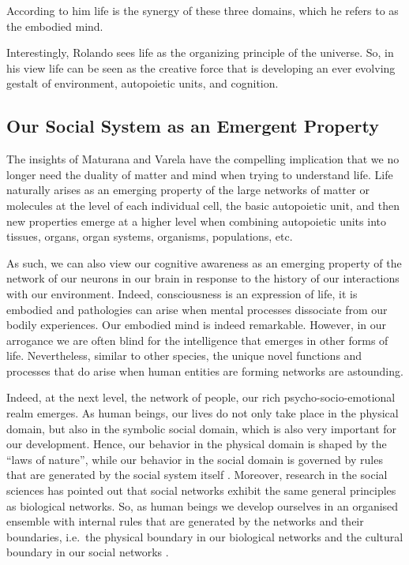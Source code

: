 \documentclass[
  11pt,
]{book}
\begin{document}
According to him life is the synergy of these three domains, which he refers to as the embodied mind.

Interestingly, Rolando sees life as the organizing principle of the universe. So, in his view life can be seen as the creative force that is developing an ever evolving gestalt of environment, autopoietic units, and cognition.

\pagebreak

\hypertarget{our-social-system-as-an-emergent-property}{%
\subsection{Our Social System as an Emergent Property}\label{our-social-system-as-an-emergent-property}}

The insights of Maturana and Varela have the compelling implication that we no longer need the duality of matter and mind when trying to understand life. Life naturally arises as an emerging property of the large networks of matter or molecules at the level of each individual cell, the basic autopoietic unit, and then new properties emerge at a higher level when combining autopoietic units into tissues, organs, organ systems, organisms, populations, etc.

As such, we can also view our cognitive awareness as an emerging property of the network of our neurons in our brain in response to the history of our interactions with our environment. Indeed, consciousness is an expression of life, it is embodied and pathologies can arise when mental processes dissociate from our bodily experiences. Our embodied mind is indeed remarkable. However, in our arrogance we are often blind for the intelligence that emerges in other forms of life. Nevertheless, similar to other species, the unique novel functions and processes that do arise when human entities are forming networks are astounding.

Indeed, at the next level, the network of people, our rich psycho-socio-emotional realm emerges. As human beings, our lives do not only take place in the physical domain, but also in the symbolic social domain, which is also very important for our development. Hence, our behavior in the physical domain is shaped by the ``laws of nature'', while our behavior in the social domain is governed by rules that are generated by the social system itself \citep{capraLuisi2014}. Moreover, research in the social sciences has pointed out that social networks exhibit the same general principles as biological networks. So, as human beings we develop ourselves in an organised ensemble with internal rules that are generated by the networks and their boundaries, i.e.~the physical boundary in our biological networks and the cultural boundary in our social networks \citep{capraLuisi2014}.
\end{document}
